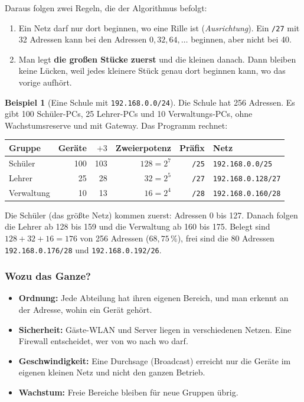 \documentclass[a4paper,12pt]{article}
\theoremstyle{definition}
\newtheorem{beispiel}{Beispiel}
\begin{document}
Daraus folgen zwei Regeln, die der Algorithmus befolgt:
\begin{enumerate}
	\item Ein Netz darf nur dort beginnen, wo eine \glqq Rille\grqq{} ist (\emph{Ausrichtung}). Ein \texttt{/27} mit 32 Adressen kann bei den Adressen $0, 32, 64, \dots$ beginnen, aber nicht bei 40.
	\item Man legt \textbf{die großen Stücke zuerst} und die kleinen danach. Dann bleiben keine Lücken, weil jedes kleinere Stück genau dort beginnen kann, wo das vorige aufhört.
\end{enumerate}

\begin{beispiel}[Eine Schule mit \texttt{192.168.0.0/24}]
	Die Schule hat 256 Adressen. Es gibt 100 Schüler-PCs, 25 Lehrer-PCs und 10 Verwaltungs-PCs, ohne Wachstumsreserve und mit Gateway. Das Programm rechnet:
	\begin{center}
	\begin{tabular}{lrrrrl}
	\toprule
	Gruppe & Geräte & $+3$ & Zweierpotenz & Präfix & Netz \\
	\midrule
	Schüler & 100 & 103 & $128 = 2^7$ & \texttt{/25} & \texttt{192.168.0.0/25} \\
	Lehrer & 25 & 28 & $32 = 2^5$ & \texttt{/27} & \texttt{192.168.0.128/27} \\
	Verwaltung & 10 & 13 & $16 = 2^4$ & \texttt{/28} & \texttt{192.168.0.160/28} \\
	\bottomrule
	\end{tabular}
	\end{center}
	Die Schüler (das größte Netz) kommen zuerst: Adressen 0 bis 127. Danach folgen die Lehrer ab 128 bis 159 und die Verwaltung ab 160 bis 175. Belegt sind $128 + 32 + 16 = 176$ von 256 Adressen ($68{,}75\,\%$), frei sind die 80 Adressen \texttt{192.168.0.176/28} und \texttt{192.168.0.192/26}.
\end{beispiel}

\subsubsection{Wozu das Ganze?}

\begin{itemize}
	\item \textbf{Ordnung:} Jede Abteilung hat ihren eigenen Bereich, und man erkennt an der Adresse, wohin ein Gerät gehört.
	\item \textbf{Sicherheit:} Gäste-WLAN und Server liegen in verschiedenen Netzen. Eine Firewall entscheidet, wer von wo nach wo darf.
	\item \textbf{Geschwindigkeit:} Eine Durchsage (Broadcast) erreicht nur die Geräte im eigenen kleinen Netz und nicht den ganzen Betrieb.
	\item \textbf{Wachstum:} Freie Bereiche bleiben für neue Gruppen übrig.
\end{itemize}
\end{document}
